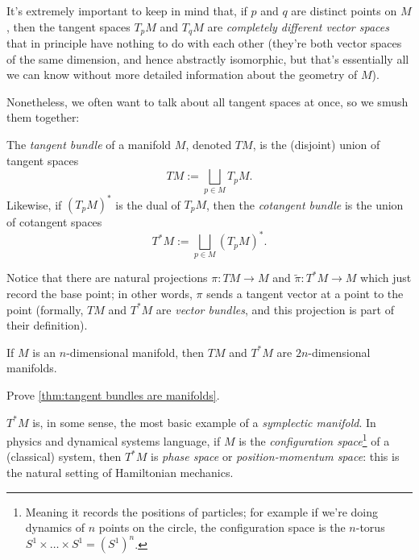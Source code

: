 
It's extremely important to keep in mind that, if $p$ and $q$ are distinct points on $M$, then the tangent spaces $T_pM$ and $T_qM$ are \emph{completely different vector spaces} that in principle have nothing to do with each other (they're both vector spaces of the same dimension, and hence abstractly isomorphic, but that's essentially all we can know without more detailed information about the geometry of $M$).

Nonetheless, we often want to talk about all tangent spaces at once, so we smush them together:

\begin{definition}\label{def:tangent bundle}
	The \emph{tangent bundle} of a manifold $M$, denoted $TM$, is the (disjoint) union of tangent spaces
	\[
		TM := \bigsqcup_{p \in M} T_p M.
	\]
	Likewise, if $(T_pM)^\ast$ is the dual of $T_pM$, then the \emph{cotangent bundle} is the union of cotangent spaces
	\[
		T^\ast M := \bigsqcup_{p \in M} (T_pM)^\ast.
	\]
\end{definition}

Notice that there are natural projections $\pi: TM \to M$ and $\widetilde{\pi}: T^\ast M \to M$ which just record the base point; in other words, $\pi$ sends a tangent vector at a point to the point (formally, $TM$ and $T^\ast M$ are \emph{vector bundles}, and this projection is part of their definition).

\begin{theorem}\label{thm:tangent bundles are manifolds}
	If $M$ is an $n$-dimensional manifold, then $TM$ and $T^\ast M$ are $2n$-dimensional manifolds.
\end{theorem}

\begin{exercise}
	Prove \cref{thm:tangent bundles are manifolds}.
\end{exercise}

$T^\ast M$ is, in some sense, the most basic example of a \emph{symplectic manifold}. In physics and dynamical systems language, if $M$ is the \emph{configuration space}\footnote{Meaning it records the positions of particles; for example if we're doing dynamics of $n$ points on the circle, the configuration space is the $n$-torus $S^1 \times \dots \times S^1 = (S^1)^n$.} of a (classical) system, then $T^\ast M$ is \emph{phase space} or \emph{position-momentum space}: this is the natural setting of Hamiltonian mechanics.

